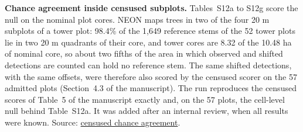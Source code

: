 \documentclass[10pt,a4paper]{article}
\begin{document}
\textbf{Chance agreement inside censused subplots.} Tables~S12a to S12g score the
null on the nominal plot cores. NEON maps trees in two of the four 20 m subplots
of a tower plot: 98.4\% of the 1,649 reference stems of the 52 tower plots lie in
two 20 m quadrants of their core, and tower cores are 8.32 of the 10.48 ha of
nominal core, so about two fifths of the area in which observed and shifted
detections are counted can hold no reference stem. The same shifted detections,
with the same offsets, were therefore also scored by the censused scorer on the
57 admitted plots (Section~4.3 of the manuscript). The run reproduces the
censused scores of Table~5 of the manuscript exactly and, on the 57 plots, the
cell-level null behind Table~S12a. It was added after an internal review, when
all results were known. Source: \href{https://github.com/devakellc/lidar-tree-benchmark/blob/main/results/censused-chance-agreement-results.md}{censused chance
agreement}.
\end{document}
